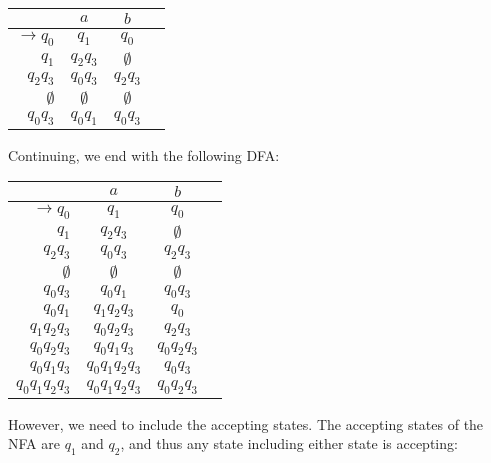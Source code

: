 \begin{center}\begin{tabular}{r c c r}
         & \(a\) & \(b\) & \\\bottomrule
    \(\to q_0\) & \(q_1\) & \(q_0\) &  \\
          \(q_1\) & \(q_2q_3\) & \(\emptyset \) & \\
          \(q_2q_3\) & \(q_0q_3\) & \(q_2q_3\) & \\
          \(\emptyset \) & \(\emptyset \) & \(\emptyset \) &\\
          \(q_0q_3\) & \(q_0q_1\) & \(q_0q_3\) & 
\end{tabular}\end{center}

Continuing, we end with the following DFA\@:

\begin{center}\begin{tabular}{r c c r}
         & \(a\) & \(b\) & \\\bottomrule
    \(\to q_0\) & \(q_1\) & \(q_0\) &  \\
          \(q_1\) & \(q_2q_3\) & \(\emptyset \) & \\
          \(q_2q_3\) & \(q_0q_3\) & \(q_2q_3\) & \\
          \(\emptyset \) & \(\emptyset \) & \(\emptyset \) &\\
          \(q_0q_3\) & \(q_0q_1\) & \(q_0q_3\) & \\
          \(q_0q_1\) & \(q_1q_2q_3\) & \(q_0\) & \\
          \(q_1q_2q_3\) & \(q_0q_2q_3\) & \(q_2q_3\) & \\
          \(q_0q_2q_3\) & \(q_0q_1q_3\) & \(q_0q_2q_3\) & \\
          \(q_0q_1q_3\) & \(q_0q_1q_2q_3\) & \(q_0q_3\) & \\
          \(q_0q_1q_2q_3\) & \(q_0q_1q_2q_3\) & \(q_0q_2q_3\) & \\
\end{tabular}\end{center}

However, we need to include the accepting states. The accepting states of the NFA are \(q_1\) and \(q_2\), and thus any state including either state is accepting:

